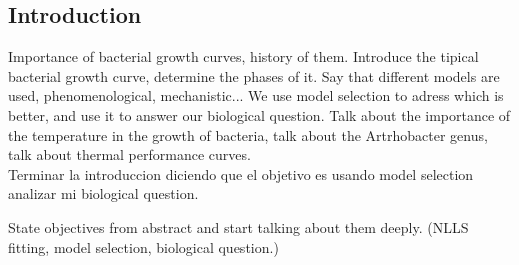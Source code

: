 \documentclass[titlepage,11pt]{article}
\begin{document}
\begin{linenumbers}
    \section{Introduction}
    Importance of bacterial growth curves, history of them. Introduce the tipical bacterial growth curve, determine the phases of it. Say that different models are used, phenomenological, mechanistic... We use model selection to adress which is better, and use it to answer our biological question. Talk about the importance of the temperature in the growth of bacteria, talk about the Artrhobacter genus,  talk about thermal performance curves.\\
    
   	Terminar la introduccion diciendo que el objetivo es usando model selection analizar mi biological question.
    
    State objectives from abstract and start talking about them deeply. (NLLS fitting, model selection, biological question.)\\
    

\end{linenumbers}
\end{document}
